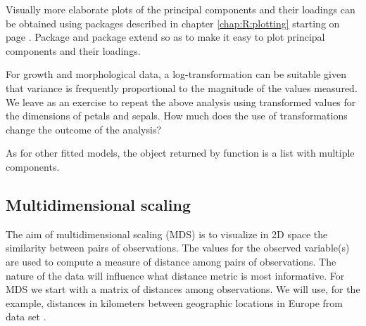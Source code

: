\documentclass[krantz2]{krantz}\usepackage{knitr}
\begin{document}
Visually more elaborate plots of the principal components and their loadings can be obtained using packages  described in chapter \ref{chap:R:plotting} starting on page \pageref{chap:R:plotting}. Package  and package  extend  so as to make it easy to plot principal components and their loadings.

\begin{playground}
For growth and morphological data, a log-transformation can be suitable given that variance is frequently proportional to the magnitude of the values measured. We leave as an exercise to repeat the above analysis using transformed values for the dimensions of petals and sepals. How much does the use of transformations change the outcome of the analysis?
\end{playground}

\begin{advplayground}
As for other fitted models, the object returned by function  is a list with multiple components.

\begin{knitrout}\footnotesize
{}\color{fgcolor}\begin{kframe}
\begin{alltt}
  \hlstd{=} \hlstd{)}
\end{alltt}
\end{kframe}
\end{knitrout}
\end{advplayground}


\subsection{Multidimensional scaling}\label{sec:stat:MDS}

The aim of multidimensional scaling (MDS) is to visualize in 2D space the similarity between pairs of observations. The values for the observed variable(s) are used to compute a measure of distance among pairs of observations. The nature of the data will influence what distance metric is most informative.
For MDS we start with a matrix of distances among observations. We will use, for the example, distances in kilometers between geographic locations in Europe from data set .
\end{document}
